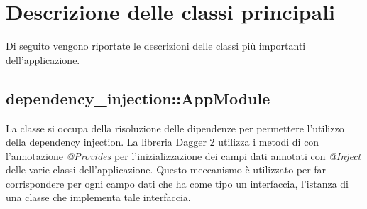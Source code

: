 \documentclass[../Tesi.tex]{subfiles}
\begin{document}
	\section{Descrizione delle classi principali}
	Di seguito vengono riportate le descrizioni delle classi più importanti dell'applicazione.

		\subsection{dependency\_injection::AppModule}
		La classe  si occupa della risoluzione delle dipendenze per permettere l'utilizzo della dependency injection. La libreria Dagger 2 utilizza i metodi di  con l'annotazione \textit{@Provides} per l'inizializzazione dei campi dati annotati con \textit{@Inject} delle varie classi dell'applicazione. Questo meccanismo è utilizzato per far corrispondere per ogni campo dati che ha come tipo un interfaccia, l'istanza di una classe che implementa tale interfaccia.
\end{document}
